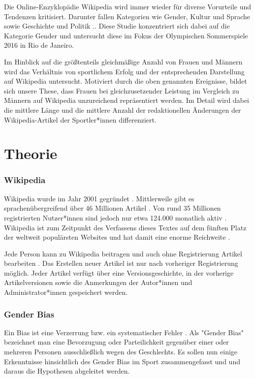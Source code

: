 \documentclass[11pt]{article}
\begin{document}
Die Online-Enzyklopädie Wikipedia wird immer wieder für diverse Vorurteile und Tendenzen kritisiert. Darunter fallen Kategorien wie Gender, Kultur und Sprache sowie Geschichte und Politik \parencite{PoppyNoor}.. Diese Studie konzentriert sich dabei auf die Kategorie Gender und untersucht diese im Fokus der Olympischen Sommerspiele 2016 in Rio de Janeiro.

Im Hinblick auf die größtenteils gleichmäßige Anzahl von Frauen und Männern wird das Verhältnis von sportlichem Erfolg und der entsprechenden Darstellung auf Wikipedia untersucht. Motiviert durch die oben genannten Ereignisse, bildet sich unsere These, dass Frauen bei gleichzusetzender Leistung im Vergleich zu Männern auf Wikipedia unzureichend repräsentiert werden. Im Detail wird dabei die mittlere Länge und die mittlere Anzahl der redaktionellen Änderungen der Wikipedia-Artikel der Sportler*innen differenziert.

\section*{Theorie}
\label{intro}
\subsubsection*{Wikipedia}
Wikipedia wurde im Jahr 2001 gegründet \parencite{wikipediaTimeline}. Mittlerweile gibt es sprachenübergreifend über 46 Millionen Artikel \parencite{wikipedia_Size}. Von rund 35 Millionen registrierten Nutzer*innen sind jedoch nur etwa 124.000 monatlich aktiv \parencite{wikipedians}. Wikipedia ist zum Zeitpunkt des Verfassens dieses Textes auf dem fünften Platz der weltweit populärsten Websites und hat damit eine enorme Reichweite \parencite{Alexa2019}.

Jede Person kann zu Wikipedia beitragen und auch ohne Registrierung Artikel bearbeiten \parencite{wikipediaTutorial}. Das Erstellen neuer Artikel ist nur nach vorheriger Registrierung möglich. Jeder Artikel verfügt über eine Versionsgeschichte, in der vorherige Artikelversionen sowie die Anmerkungen der Autor*innen und Administrator*innen gespeichert werden.

\subsubsection*{Gender Bias}

Ein Bias ist eine Verzerrung bzw. ein systematischer Fehler \parencite{Wirtz}. Als "Gender Bias" bezeichnet man eine Bevorzugung oder Parteilichkeit gegenüber einer oder mehreren Personen ausschließlich wegen des Geschlechts. Es sollen nun einige Erkenntnisse hinsichtlich des Gender Bias im Sport zusammengefasst und und daraus die Hypothesen abgeleitet werden.
\end{document}
